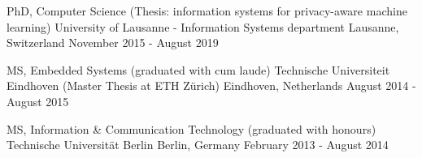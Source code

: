 

\begin{cventries}

  	\vspace{-0.1cm}
    \cventry
    {PhD, Computer Science (Thesis: information systems for privacy-aware machine learning)} %
    {University of Lausanne - Information Systems department} %
    {Lausanne, Switzerland} %
    {November 2015 - August 2019} %
    {}
    
    \vspace{-0.5cm}
    \cventry
    {MS, Embedded Systems (graduated with cum laude)}
    {Technische Universiteit Eindhoven (Master Thesis at ETH Zürich)}
    {Eindhoven, Netherlands}
    {August 2014 - August 2015}
    {}
	
	\vspace{-0.5cm}
    \cventry
    {MS, Information \& Communication Technology (graduated with honours)} %
    {Technische Universität Berlin} %
    {Berlin, Germany} %
    {February 2013 - August 2014} %
    {}

	\vspace{-0.7cm}
\end{cventries}
